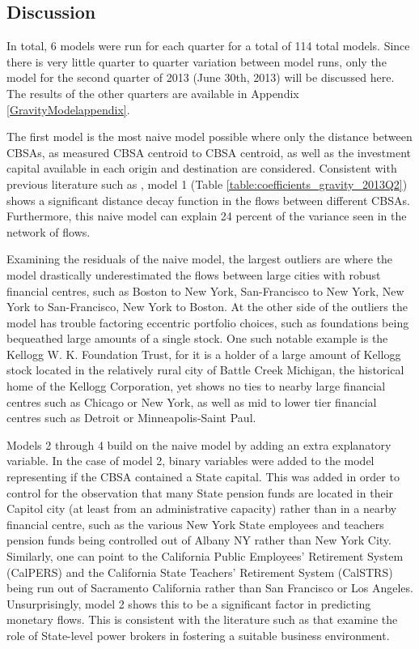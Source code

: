 \subsection{Discussion}

In total, 6 models were run for each quarter for a total of 114 total models.  Since there is very little quarter to quarter variation between model runs, only the model for the second quarter of 2013 (June 30th, 2013) will be discussed here.  The results of the other quarters are available in Appendix \ref{GravityModelappendix}.  

The first model is the most naive model possible where only the distance between CBSAs, as measured CBSA centroid to CBSA centroid, as well as the investment capital available in each origin and destination are considered.  Consistent with previous literature such as \cite{Green1995,gravesthe1998,covalhome1999,covalthe2001,Dovak2005}, model 1 (Table \ref{table:coefficients_gravity_2013Q2}) shows a significant distance decay function in the flows between different CBSAs. Furthermore, this naive model can explain 24 percent of the variance seen in the network of flows.  

Examining the residuals of the naive model, the largest outliers are where the model drastically underestimated the flows between large cities with robust financial centres, such as Boston to New York, San-Francisco to New York, New York to San-Francisco, New York to Boston. At the other side of the outliers the model has trouble factoring eccentric portfolio choices, such as foundations being bequeathed large amounts of a single stock.  One such notable example is the Kellogg W. K. Foundation Trust, for it is a holder of a large amount of Kellogg stock located in the relatively rural city of Battle Creek Michigan, the historical home of the Kellogg Corporation, yet shows no ties to nearby large financial centres such as Chicago or New York, as well as mid to lower tier financial centres such as Detroit or Minneapolis-Saint Paul.  

Models 2 through 4 build on the naive model by adding an extra explanatory variable.  In the case of model 2, binary variables were added to the model representing if the CBSA contained a State capital.  This was added in order to control for the observation that many State pension funds are located in their Capitol city (at least from an administrative capacity) rather than in a nearby financial centre, such as the various New York State employees and teachers pension funds being controlled out of Albany NY rather than New York City.  Similarly, one can point to the California Public Employees' Retirement System  (CalPERS) and the California State Teachers' Retirement System (CalSTRS) being run out of Sacramento California rather than San Francisco or Los Angeles.  Unsurprisingly, model 2 shows this to be a significant factor in predicting monetary flows. This is consistent with the literature such as \cite{Bradley2016} that examine the role of State-level power brokers in fostering a suitable business environment.

